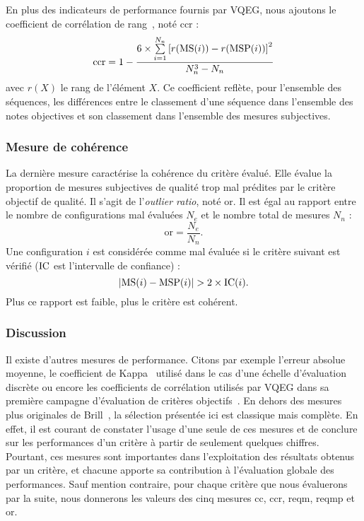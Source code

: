 En plus des indicateurs de performance fournis par VQEG, nous ajoutons le coefficient de corrélation de rang~\cite{spearman-ajp}, noté ccr :
\begin{equation}
\text{ccr} = 1 - \dfrac{6\times\sum\limits_{i=1}^{N_n} \left[r(\text{MS}(i)) - r(\text{MSP}(i))\right]^2}{N_n^3 - N_n}
\end{equation}
%
avec $r(X)$ le rang de l'élément $X$. Ce coefficient reflète, pour l'ensemble des séquences, les différences entre le classement d’une séquence dans l’ensemble des notes objectives et son classement dans l’ensemble des mesures subjectives.


\subsubsection{Mesure de cohérence}
La dernière mesure caractérise la cohérence du critère évalué. Elle évalue la proportion de mesures subjectives de qualité trop mal prédites par le critère objectif de qualité. Il s'agit de l'\emph{outlier ratio}, noté or. Il est égal au rapport entre le nombre de configurations mal évaluées $N_e$ et le nombre total de mesures $N_n$ :
\begin{equation}
\text{or} = \frac{N_{e}}{N_n}. \label{eq:or}
\end{equation}
%
Une configuration $i$ est considérée comme mal évaluée si le critère suivant est vérifié ($\text{IC}$ est l'intervalle de confiance) :
\begin{equation}
|\text{MS}(i) - \text{MSP}(i)| > 2\times\text{IC}(i).
\end{equation}
%
Plus ce rapport est faible, plus le critère est cohérent.


\subsubsection{Discussion}
Il existe d'autres mesures de performance. Citons par exemple l'erreur absolue moyenne, le coefficient de Kappa~\cite{cohen-kappa} utilisé dans le cas d'une échelle d'évaluation discrète ou encore les coefficients de corrélation utilisés par VQEG dans sa première campagne d'évaluation de critères objectifs~\cite{vqeg-frtv1}. En dehors des mesures plus originales de Brill~\cite{brill-spic}, la sélection présentée ici est classique mais complète. En effet, il est courant de constater l'usage d'une seule de ces mesures et de conclure sur les performances d'un critère à partir de seulement quelques chiffres. Pourtant, ces mesures sont importantes dans l'exploitation des résultats obtenus par un critère, et chacune apporte sa contribution à l'évaluation globale des performances. Sauf mention contraire, pour chaque critère que nous évaluerons par la suite, nous donnerons les valeurs des cinq mesures cc, ccr, reqm, reqmp et or.


